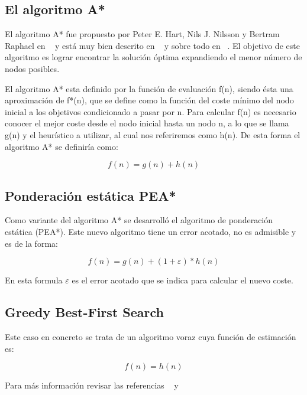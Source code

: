 \documentclass[runningheads]{llncs}
\begin{document}
\subsection{El algoritmo A*}

El algoritmo A* fue propuesto por Peter E. Hart, Nils J. Nilsson y Bertram Raphael en ~\cite{referencia_Korf_9} y está muy bien descrito en ~\cite{referencia_Nilsson} y sobre todo en ~\cite{referencia_Pearl}. El objetivo de este algoritmo es lograr encontrar la solución óptima expandiendo el menor número de nodos posibles.

El algoritmo A* esta definido por la función de evaluación f(n), siendo ésta una aproximación de f*(n), que se define como la función del coste mínimo del nodo inicial a los objetivos condicionado a pasar por n. Para calcular f(n) es necesario conocer el mejor coste desde el nodo inicial hasta un nodo n, a lo que se llama g(n) y el heurístico a utilizar, al cual nos referiremos como h(n). De esta forma el algoritmo A* se definiría como:

\begin{equation}
f(n) = g(n) + h(n)
\end{equation}

\subsection{Ponderación estática PEA*}

Como variante del algoritmo A* se desarrolló el algoritmo de ponderación estática (PEA*). Este nuevo algoritmo tiene un error acotado, no es admisible y es de la forma:

\begin{equation}
f(n) = g(n) + (1 + \varepsilon) * h(n)
\end{equation}

En esta formula $\varepsilon$ es el error acotado que se indica para calcular el nuevo coste.

\subsection{Greedy Best-First Search}

Este caso en concreto se trata de un algoritmo voraz cuya función de estimación es:

\begin{equation}
f(n) = h(n)
\end{equation}

Para más información revisar las referencias ~\cite{referencia_Russell} y ~\cite{referencia_Geek}
\end{document}
